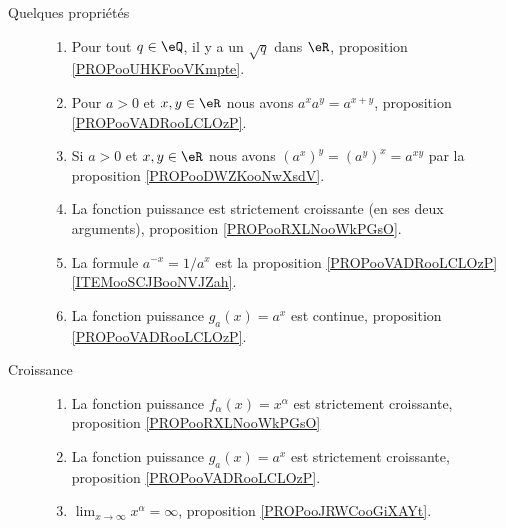 \begin{description}
	\item[Quelques propriétés]
	      \begin{enumerate}
		      \item
		            Pour tout \( q\in \eQ\), il y a un \( \sqrt{ q }\) dans \( \eR\), proposition \ref{PROPooUHKFooVKmpte}.
		      \item
		            Pour \( a>0\) et \( x,y\in \eR\) nous avons \( a^xa^y=a^{x+y}\), proposition \ref{PROPooVADRooLCLOzP}.
		      \item
		            Si \( a>0\) et \( x,y\in \eR\) nous avons \( (a^x)^y=(a^y)^x=a^{xy}\) par la proposition \ref{PROPooDWZKooNwXsdV}.
		      \item
		            La fonction puissance est strictement croissante (en ses deux arguments), proposition \ref{PROPooRXLNooWkPGsO}.
		      \item
		            La formule \( a^{-x}=1/a^x\) est la proposition \ref{PROPooVADRooLCLOzP}\ref{ITEMooSCJBooNVJZah}.
		      \item
		            La fonction puissance \( g_a(x)=a^x\) est continue, proposition \ref{PROPooVADRooLCLOzP}.
	      \end{enumerate}
	\item[Croissance]
	      \begin{enumerate}
		      \item
		            La fonction puissance \( f_{\alpha}(x)=x^{\alpha}\) est strictement croissante, proposition \ref{PROPooRXLNooWkPGsO}
		      \item
		            La fonction puissance \( g_a(x)=a^x\) est strictement croissante, proposition \ref{PROPooVADRooLCLOzP}.
		      \item
		            \( \lim_{x\to \infty} x^{\alpha}=\infty\), proposition \ref{PROPooJRWCooGiXAYt}.
	      \end{enumerate}


\end{description}
